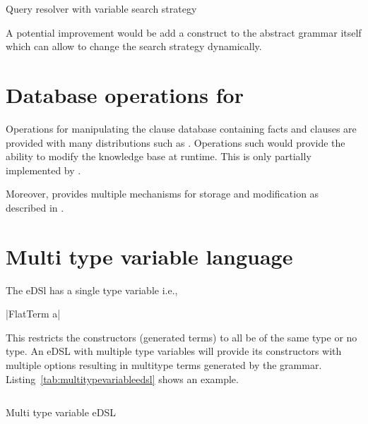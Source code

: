 \documentclass[thesis-solanki.tex]{subfiles}
\begin{document}
\begin{code-list}[H]
\begin{singlespace}
\inputminted{haskell}{haskell-proto4-query-resolver-variable-search-strat.hs}
\end{singlespace}
\caption{Query resolver with variable search strategy}
\label{tab:queryresolvervariablesearchstrat}
\end{code-list}  

A potential improvement would be add a construct to the abstract grammar itself which can allow to change the
search strategy dynamically.

\section{Database operations for }
Operations for manipulating the clause database containing facts and clauses are provided with many
 distributions such as  \cite{website:swiprologdbops}.
Operations such  \cite{website:assertzswiprolog} would provide the ability to modify the
knowledge base at runtime.
This is only partially implemented by  \cite{prolog-lib}.

Moreover,  provides multiple mechanisms for storage and modification as described in
\cite{website:swiprologdbops}.

\section{Multi type variable language}
The eDSl  has a single type variable i.e.,

|FlatTerm a|

This restricts the constructors (generated terms) to all be of the same type or no type.
An eDSL with multiple type variables will provide its constructors with multiple options resulting in multitype
terms generated by the grammar.
Listing~\ref{tab:multitypevariableedsl} shows an example.

\begin{code-list}[H]
\begin{singlespace}
\inputminted{haskell}{haskell-proto4-multi-type-variable-edsl.hs}
\end{singlespace}
\caption{Multi type variable eDSL}
\label{tab:multitypevariableedsl}
\end{code-list}
\end{document}
